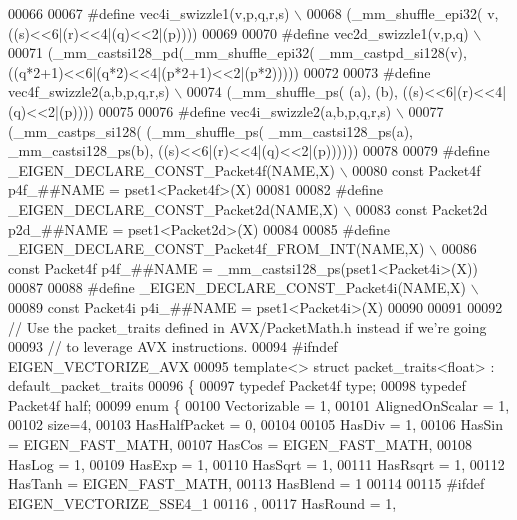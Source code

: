 \begin{DoxyCode}
00066 
00067 \textcolor{preprocessor}{#define vec4i\_swizzle1(v,p,q,r,s) \(\backslash\)}
00068 \textcolor{preprocessor}{  (\_mm\_shuffle\_epi32( v, ((s)<<6|(r)<<4|(q)<<2|(p))))}
00069 
00070 \textcolor{preprocessor}{#define vec2d\_swizzle1(v,p,q) \(\backslash\)}
00071 \textcolor{preprocessor}{  (\_mm\_castsi128\_pd(\_mm\_shuffle\_epi32( \_mm\_castpd\_si128(v), ((q*2+1)<<6|(q*2)<<4|(p*2+1)<<2|(p*2)))))}
00072   
00073 \textcolor{preprocessor}{#define vec4f\_swizzle2(a,b,p,q,r,s) \(\backslash\)}
00074 \textcolor{preprocessor}{  (\_mm\_shuffle\_ps( (a), (b), ((s)<<6|(r)<<4|(q)<<2|(p))))}
00075 
00076 \textcolor{preprocessor}{#define vec4i\_swizzle2(a,b,p,q,r,s) \(\backslash\)}
00077 \textcolor{preprocessor}{  (\_mm\_castps\_si128( (\_mm\_shuffle\_ps( \_mm\_castsi128\_ps(a), \_mm\_castsi128\_ps(b),
       ((s)<<6|(r)<<4|(q)<<2|(p))))))}
00078 
00079 \textcolor{preprocessor}{#define \_EIGEN\_DECLARE\_CONST\_Packet4f(NAME,X) \(\backslash\)}
00080 \textcolor{preprocessor}{  const Packet4f p4f\_##NAME = pset1<Packet4f>(X)}
00081 
00082 \textcolor{preprocessor}{#define \_EIGEN\_DECLARE\_CONST\_Packet2d(NAME,X) \(\backslash\)}
00083 \textcolor{preprocessor}{  const Packet2d p2d\_##NAME = pset1<Packet2d>(X)}
00084 
00085 \textcolor{preprocessor}{#define \_EIGEN\_DECLARE\_CONST\_Packet4f\_FROM\_INT(NAME,X) \(\backslash\)}
00086 \textcolor{preprocessor}{  const Packet4f p4f\_##NAME = \_mm\_castsi128\_ps(pset1<Packet4i>(X))}
00087 
00088 \textcolor{preprocessor}{#define \_EIGEN\_DECLARE\_CONST\_Packet4i(NAME,X) \(\backslash\)}
00089 \textcolor{preprocessor}{  const Packet4i p4i\_##NAME = pset1<Packet4i>(X)}
00090 
00091 
00092 \textcolor{comment}{// Use the packet\_traits defined in AVX/PacketMath.h instead if we're going}
00093 \textcolor{comment}{// to leverage AVX instructions.}
00094 \textcolor{preprocessor}{#ifndef EIGEN\_VECTORIZE\_AVX}
00095 \textcolor{keyword}{template}<> \textcolor{keyword}{struct }packet\_traits<float>  : default\_packet\_traits
00096 \{
00097   \textcolor{keyword}{typedef} Packet4f type;
00098   \textcolor{keyword}{typedef} Packet4f half;
00099   \textcolor{keyword}{enum} \{
00100     Vectorizable = 1,
00101     AlignedOnScalar = 1,
00102     size=4,
00103     HasHalfPacket = 0,
00104 
00105     HasDiv  = 1,
00106     HasSin  = EIGEN\_FAST\_MATH,
00107     HasCos  = EIGEN\_FAST\_MATH,
00108     HasLog  = 1,
00109     HasExp  = 1,
00110     HasSqrt = 1,
00111     HasRsqrt = 1,
00112     HasTanh  = EIGEN\_FAST\_MATH,
00113     HasBlend = 1
00114 
00115 \textcolor{preprocessor}{#ifdef EIGEN\_VECTORIZE\_SSE4\_1}
00116     ,
00117     HasRound = 1,

\end{DoxyCode}
